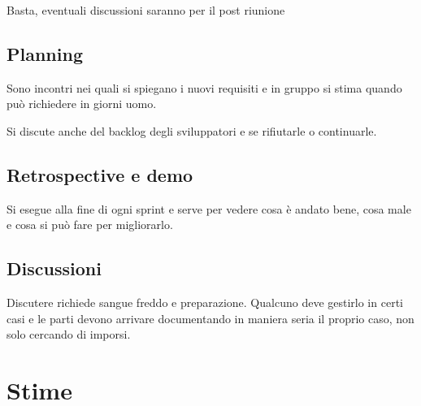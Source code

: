\documentclass[11pt,a4paper]{book}
\begin{document}
Basta, eventuali discussioni saranno per il post riunione

\subsection{Planning}
Sono incontri nei quali si spiegano i nuovi requisiti e in gruppo si stima quando può richiedere in giorni uomo.

Si discute anche del backlog degli sviluppatori e se rifiutarle o continuarle.

\subsection{Retrospective e demo}
Si esegue alla fine di ogni sprint e serve per vedere cosa è andato bene, cosa male e cosa si può fare per migliorarlo.

\subsection{Discussioni}
Discutere richiede sangue freddo e preparazione. Qualcuno deve gestirlo in certi casi e le parti devono arrivare documentando in maniera seria il proprio caso, non solo cercando di imporsi.

\section{Stime}
\end{document}
